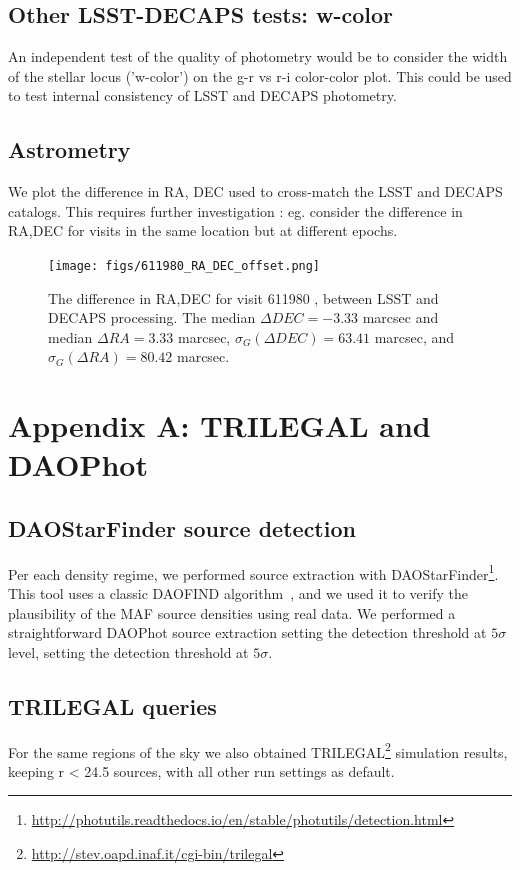 \documentclass[DM,lsstdraft,toc,usenatbib]{lsstdoc}
\begin{document}
\subsection{Other LSST-DECAPS tests: w-color }
An independent test of the quality of photometry would be to consider the width of the stellar locus ('w-color') on the g-r vs r-i color-color plot.  This could be used to test internal consistency of LSST and DECAPS photometry. 

\subsection{Astrometry}
We plot the difference in RA, DEC  used to cross-match the LSST and DECAPS catalogs. This requires further investigation : eg. consider the difference in RA,DEC for visits in the same location but at different epochs. 


\begin{figure}
\begin{centering}
\texttt{[image: figs/611980\_RA\_DEC\_offset.png]}
\caption{The difference in RA,DEC for visit 611980 , between LSST and DECAPS processing. The median $\Delta DEC=-3.33 $  marcsec  and median $\Delta RA = 3.33$ marcsec,  $\sigma_{G}(\Delta DEC) = 63.41$ marcsec, and $\sigma_{G}(\Delta RA) = 80.42$ marcsec. }
\label{fig:ra_dec_offset}
\end{centering}
\end{figure} 

\appendix
\section{Appendix A: TRILEGAL and DAOPhot}
\label{sec:appendixA}


\subsection{DAOStarFinder source detection}
Per each density regime, we performed source extraction with DAOStarFinder\footnote{\url{http://photutils.readthedocs.io/en/stable/photutils/detection.html}}.  This tool uses a classic DAOFIND algorithm~\citep{stetson1987}, and  we used it to verify the plausibility of the MAF source densities using real data.  We performed a straightforward DAOPhot source extraction setting  the detection threshold at $5 \sigma$ level, setting the detection threshold at $5\sigma$. 

\subsection{TRILEGAL queries}
For the same regions of the sky we also  obtained TRILEGAL\footnote{\url{http://stev.oapd.inaf.it/cgi-bin/trilegal}} simulation results, keeping  r < 24.5  sources, with all other run settings as default.  
\end{document}
